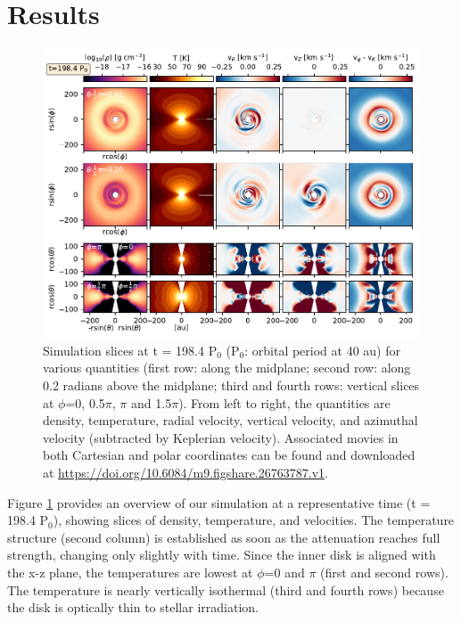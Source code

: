 \documentclass[twocolumn,tighten]{aastex631}
\begin{document}
\section{Results} \label{sec:results}
\begin{figure}
\includegraphics[width=\linewidth]{Figure1.pdf}
    \caption{Simulation slices at t = 198.4 P$_0$ (P$_0$: orbital period at 40 au) for various quantities (first row: along the midplane; second row: along 0.2 radians above the midplane; third and fourth rows: vertical slices at $\phi$=0, 0.5$\pi$, $\pi$ and 1.5$\pi$). From left to right, the quantities are density, temperature, radial velocity, vertical velocity, and azimuthal velocity (subtracted by Keplerian velocity). Associated movies in both Cartesian and polar coordinates can be found and downloaded at \url{https://doi.org/10.6084/m9.figshare.26763787.v1}.}
    \label{fig:1}
\end{figure}

Figure \ref{fig:1} provides an overview of our simulation at a representative time (t = 198.4 P$_0$), showing slices of density, temperature, and velocities. The temperature structure (second column) is established as soon as the attenuation reaches full strength, changing only slightly with time. Since the inner disk is aligned with the x-z plane, the temperatures are lowest at $\phi$=0 and $\pi$ (first and second rows). The temperature is nearly vertically isothermal (third and fourth rows) because the disk is optically thin to stellar irradiation.
\end{document}
